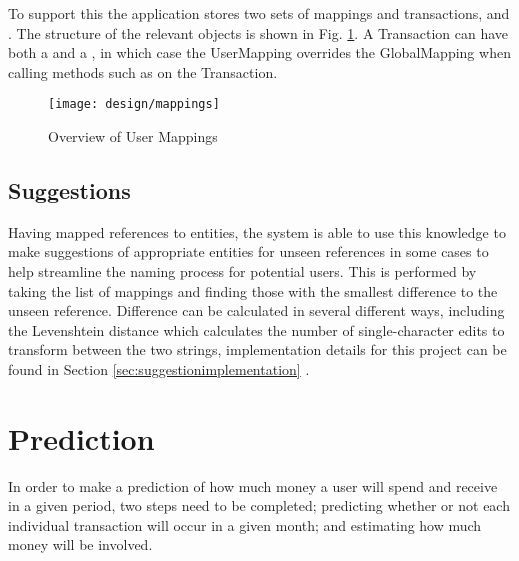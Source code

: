 To support this the application stores two sets of mappings and transactions,  and . The structure of the relevant objects is shown in Fig. \ref{fig:transactormappings}. A Transaction can have both a  and a  , in which case the UserMapping overrides the GlobalMapping when calling methods such as  on the Transaction.

\begin{figure}[h]
    \centering
    \texttt{[image: design/mappings]}
    \caption{Overview of User Mappings}
    \label{fig:transactormappings}
    
    \begin{comment}
[Transaction]<>*-0..1[UserMapping]
[Transaction]<>*-0..1-[GlobalMapping]
[User]<>-*[UserMapping]
[UserMapping]<>*-[UserTransactor]
[UserTransactor]<>*-[Category]
[GlobalTransactor]<>*-[Category]
[GlobalMapping]<>*-[GlobalTransactor]
    \end{comment}
\end{figure}

\subsection{Suggestions}
Having mapped \glspl{reference} to entities, the system is able to use this knowledge to make suggestions of appropriate entities for unseen references in some cases to help streamline the naming process for potential users.
%
This is performed by taking the list of mappings and finding those with the smallest difference to the unseen reference. Difference can be calculated in several different ways, including the Levenshtein distance which calculates the number of single-character edits to transform between the two strings, implementation details for this project can be found in Section \ref{sec:suggestionimplementation} \parencite{levenshtein1966binary}.

\section{Prediction} \label{section:prediction-system}
In order to make a prediction of how much money a user will spend and receive in a given period, two steps need to be completed; predicting whether or not each individual transaction will occur in a given month; and estimating how much money will be involved.

